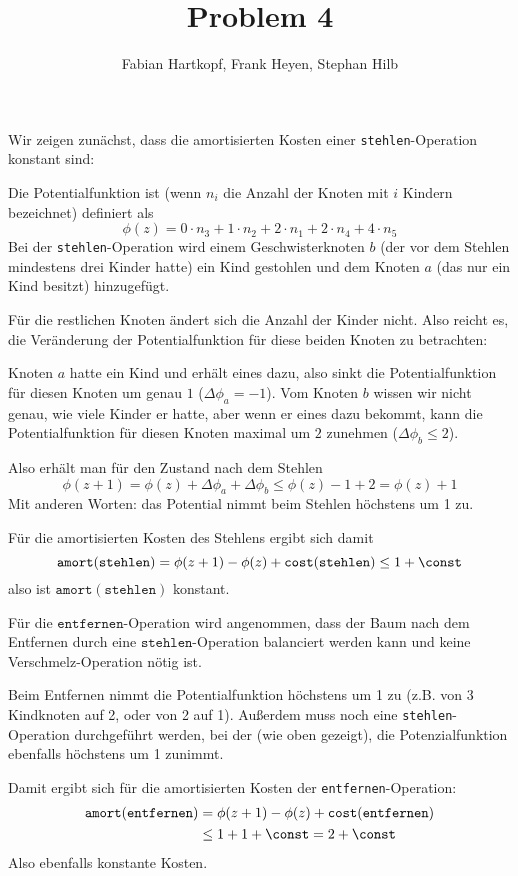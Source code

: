 \documentclass{scrartcl}
\author{Fabian Hartkopf, Frank Heyen, Stephan Hilb}
\title{Problem 4}
\newcommand{\stehlen}{\texttt{stehlen}}
\newcommand{\amort}{\texttt{amort}}
\newcommand{\cost}{\texttt{cost}}
\newcommand{\entfernen}{\texttt{entfernen}}
\begin{document}
\maketitle
Wir zeigen zunächst, dass die amortisierten Kosten einer \stehlen-Operation konstant sind:

Die Potentialfunktion ist (wenn $n_i$ die Anzahl der Knoten mit $i$ Kindern bezeichnet) definiert als
\[
	\phi(z) = 0\cdot n_3 + 1\cdot n_2 + 2\cdot n_1 + 2\cdot n_4 + 4\cdot n_5
\]
Bei der \stehlen-Operation wird einem Geschwisterknoten $b$ (der vor dem Stehlen mindestens drei Kinder hatte) ein Kind gestohlen und dem Knoten $a$ (das nur ein Kind besitzt) hinzugefügt.

Für die restlichen Knoten ändert sich die Anzahl der Kinder nicht.
Also reicht es, die Veränderung der Potentialfunktion für diese beiden Knoten zu betrachten:

Knoten $a$ hatte ein Kind und erhält eines dazu, also sinkt die Potentialfunktion für diesen Knoten um genau $1$ ($\Delta\phi_a = -1$).
Vom Knoten $b$ wissen wir nicht genau, wie viele Kinder er hatte, aber wenn er eines dazu bekommt, kann die Potentialfunktion für diesen Knoten maximal um $2$ zunehmen ($\Delta\phi_b \le 2$).

Also erhält man für den Zustand nach dem Stehlen
\[
	\phi(z+1) = \phi(z) + \Delta\phi_a +\Delta\phi_b \le \phi(z) - 1 + 2 = \phi(z) + 1
\]
Mit anderen Worten: das Potential nimmt beim Stehlen höchstens um 1 zu.

Für die amortisierten Kosten des Stehlens ergibt sich damit
\[
	\amort(\stehlen) = \phi(z+1) - \phi(z) + \cost(\stehlen) \le 1 + \const
\]
also ist $\amort(\stehlen)$ konstant.

Für die $\entfernen$-Operation wird angenommen, dass der Baum nach dem Entfernen durch eine $\stehlen$-Operation balanciert werden kann und keine Verschmelz-Operation nötig ist.

Beim Entfernen nimmt die Potentialfunktion höchstens um 1 zu (z.B. von 3 Kindknoten auf 2, oder von 2 auf 1).
Außerdem muss noch eine \stehlen-Operation durchgeführt werden, bei der (wie oben gezeigt), die Potenzialfunktion ebenfalls höchstens um 1 zunimmt.

Damit ergibt sich für die amortisierten Kosten der \entfernen-Operation:
\begin{align*}
	\amort(\entfernen) &= \phi(z+1) - \phi(z) + \cost(\entfernen)\\
					   &\le 1 + 1 + \const = 2 +\const
\end{align*}
Also ebenfalls konstante Kosten.
\end{document}
